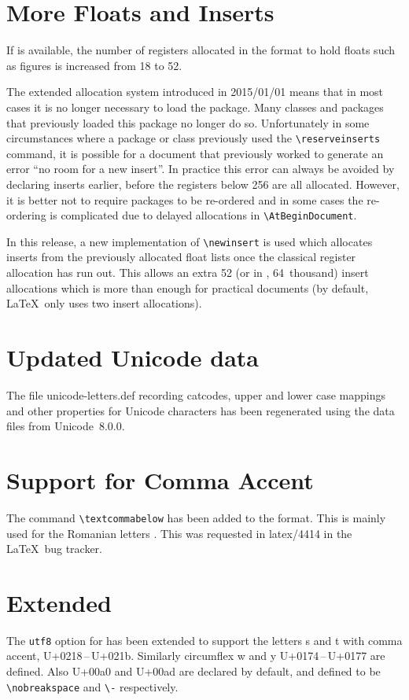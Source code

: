 \documentclass{ltnews}
\begin{document}
\section{More Floats and Inserts}
If  is available, the number of registers allocated in
the format to hold floats such as figures is increased from 18 to 52.

The extended allocation system introduced in 2015/01/01 means that in
most cases it is no longer necessary to load the 
package. Many classes and packages that previously loaded this package
no longer do so. Unfortunately in some circumstances where a package
or class previously used the  \verb|\reserveinserts|
command, it is possible for a document that previously worked to
generate an error ``no room for a new insert''. In practice this error
can always be avoided by declaring inserts earlier, before the
registers below 256 are all allocated. However, it is better not
to require packages to be re-ordered and in some cases the re-ordering
is complicated due to delayed allocations in \verb|\AtBeginDocument|.

In this release, a new implementation of
\verb|\newinsert| is used which allocates inserts from the previously
allocated float lists once the classical register allocation has run
out. This allows an extra 52 (or in , 64~thousand)
insert allocations which is more than enough for practical documents
(by default, \LaTeX\ only uses two insert allocations).

\section{Updated Unicode data}


The file \textsf{unicode-letters.def} recording catcodes, upper and
lower case mappings and other properties for Unicode characters has
been regenerated using the data files from Unicode~8.0.0.

\section{Support for Comma Accent}
The command \verb|\textcommabelow| has been added to the format.
This is mainly used for the Romanian letters
.
This was requested in latex/4414 in the \LaTeX\ bug tracker.

\section{Extended }
The \texttt{utf8} option for  has been extended to support
the letters s and t with comma accent,
U+0218\,--\,U+021b. Similarly circumflex w and y U+0174\,--\,U+0177 are defined.
Also U+00a0 and U+00ad are declared by default, and defined to be
\verb|\nobreakspace| and \verb|\-| respectively.
\end{document}
